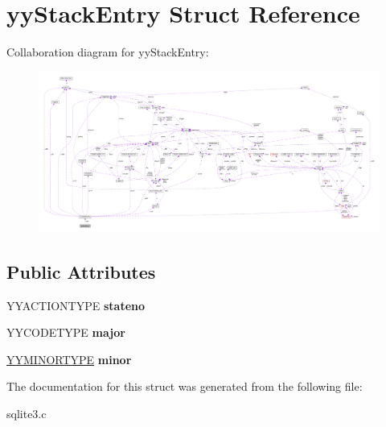 \hypertarget{structyy_stack_entry}{\section{yy\-Stack\-Entry Struct Reference}
\label{structyy_stack_entry}
}


Collaboration diagram for yy\-Stack\-Entry\-:\nopagebreak
\begin{figure}[H]
\begin{center}
\leavevmode
\includegraphics[width=350pt]{structyy_stack_entry__coll__graph}
\end{center}
\end{figure}
\subsection*{Public Attributes}
\begin{DoxyCompactItemize}
\item 
\hypertarget{structyy_stack_entry_a108164609c2e841577cc3533d8f0180d}{Y\-Y\-A\-C\-T\-I\-O\-N\-T\-Y\-P\-E {\bfseries stateno}}\label{structyy_stack_entry_a108164609c2e841577cc3533d8f0180d}

\item 
\hypertarget{structyy_stack_entry_a7624d02bcf945d48068f4c383551725c}{Y\-Y\-C\-O\-D\-E\-T\-Y\-P\-E {\bfseries major}}\label{structyy_stack_entry_a7624d02bcf945d48068f4c383551725c}

\item 
\hypertarget{structyy_stack_entry_a024e1e64bce5945080629a2dd8d1bb4f}{\hyperlink{union_y_y_m_i_n_o_r_t_y_p_e}{Y\-Y\-M\-I\-N\-O\-R\-T\-Y\-P\-E} {\bfseries minor}}\label{structyy_stack_entry_a024e1e64bce5945080629a2dd8d1bb4f}

\end{DoxyCompactItemize}


The documentation for this struct was generated from the following file\-:\begin{DoxyCompactItemize}
\item 
sqlite3.\-c\end{DoxyCompactItemize}
